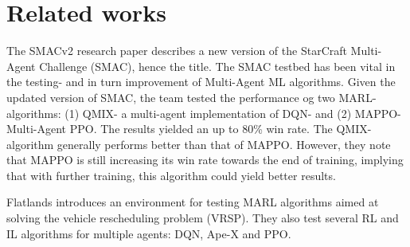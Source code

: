 \documentclass[conference]{IEEEtran}
\begin{document}
	\noindent


	\section{Related works}
	The SMACv2 \cite{ellis2022smacv2} research paper describes a new version of the StarCraft Multi-Agent
  Challenge (SMAC), hence the title. The SMAC testbed has been vital in the testing- and in turn improvement
  of Multi-Agent ML algorithms. Given the updated version of SMAC, the team tested the performance og two
  MARL- algorithms: (1) QMIX- a multi-agent implementation of DQN- and (2) MAPPO- Multi-Agent PPO. The
  results yielded an up to 80\% win rate. The QMIX-algorithm generally performs better than that of MAPPO.
  However, they note that MAPPO is still increasing its win rate towards the end of training, implying
  that with further training, this algorithm could yield better results.

  Flatlands \cite{laurent2021flatland} introduces an environment for testing MARL algorithms aimed at
  solving the vehicle rescheduling problem (VRSP). They also test several RL and IL algorithms for
  multiple agents: DQN, Ape-X and PPO. 




\end{document}
